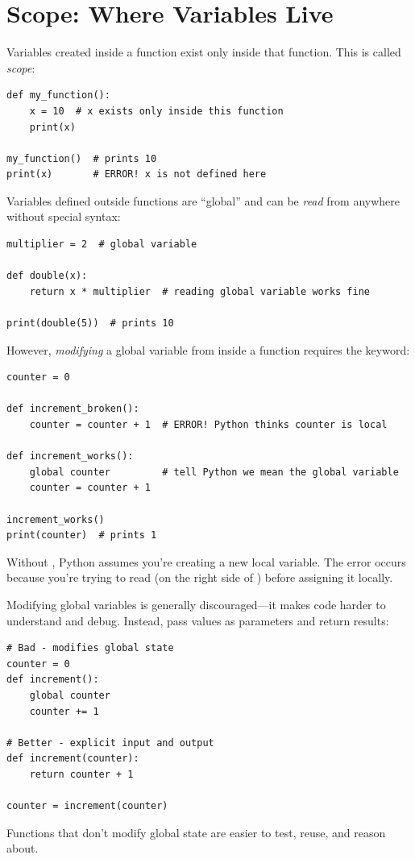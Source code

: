 \section{Scope: Where Variables Live}
\label{sec:scope}

Variables created inside a function exist only inside that function. This is called \emph{scope}:

\begin{lstlisting}
def my_function():
    x = 10  # x exists only inside this function
    print(x)

my_function()  # prints 10
print(x)       # ERROR! x is not defined here
\end{lstlisting}

Variables defined outside functions are ``global'' and can be \emph{read} from anywhere without special syntax:

\begin{lstlisting}
multiplier = 2  # global variable

def double(x):
    return x * multiplier  # reading global variable works fine

print(double(5))  # prints 10
\end{lstlisting}

However, \emph{modifying} a global variable from inside a function requires the  keyword:

\begin{lstlisting}
counter = 0

def increment_broken():
    counter = counter + 1  # ERROR! Python thinks counter is local

def increment_works():
    global counter         # tell Python we mean the global variable
    counter = counter + 1

increment_works()
print(counter)  # prints 1
\end{lstlisting}

Without , Python assumes you're creating a new local variable. The error occurs because you're trying to read  (on the right side of \py{=}) before assigning it locally.

\begin{warning}
Modifying global variables is generally discouraged---it makes code harder to understand and debug. Instead, pass values as parameters and return results:
\begin{lstlisting}
# Bad - modifies global state
counter = 0
def increment():
    global counter
    counter += 1

# Better - explicit input and output
def increment(counter):
    return counter + 1

counter = increment(counter)
\end{lstlisting}
Functions that don't modify global state are easier to test, reuse, and reason about.
\end{warning}

